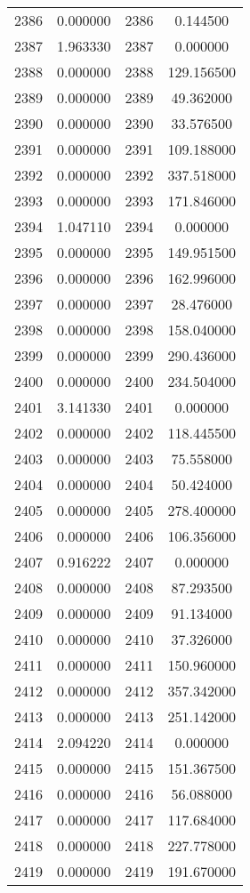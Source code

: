 \documentclass[12pt]{article}
\begin{document}
\begin{longtable}{@{}cccc@{}}
2386 & 0.000000 & 2386 & 0.144500 \\
2387 & 1.963330 & 2387 & 0.000000 \\
2388 & 0.000000 & 2388 & 129.156500 \\
2389 & 0.000000 & 2389 & 49.362000 \\
2390 & 0.000000 & 2390 & 33.576500 \\
2391 & 0.000000 & 2391 & 109.188000 \\
2392 & 0.000000 & 2392 & 337.518000 \\
2393 & 0.000000 & 2393 & 171.846000 \\
2394 & 1.047110 & 2394 & 0.000000 \\
2395 & 0.000000 & 2395 & 149.951500 \\
2396 & 0.000000 & 2396 & 162.996000 \\
2397 & 0.000000 & 2397 & 28.476000 \\
2398 & 0.000000 & 2398 & 158.040000 \\
2399 & 0.000000 & 2399 & 290.436000 \\
2400 & 0.000000 & 2400 & 234.504000 \\
2401 & 3.141330 & 2401 & 0.000000 \\
2402 & 0.000000 & 2402 & 118.445500 \\
2403 & 0.000000 & 2403 & 75.558000 \\
2404 & 0.000000 & 2404 & 50.424000 \\
2405 & 0.000000 & 2405 & 278.400000 \\
2406 & 0.000000 & 2406 & 106.356000 \\
2407 & 0.916222 & 2407 & 0.000000 \\
2408 & 0.000000 & 2408 & 87.293500 \\
2409 & 0.000000 & 2409 & 91.134000 \\
2410 & 0.000000 & 2410 & 37.326000 \\
2411 & 0.000000 & 2411 & 150.960000 \\
2412 & 0.000000 & 2412 & 357.342000 \\
2413 & 0.000000 & 2413 & 251.142000 \\
2414 & 2.094220 & 2414 & 0.000000 \\
2415 & 0.000000 & 2415 & 151.367500 \\
2416 & 0.000000 & 2416 & 56.088000 \\
2417 & 0.000000 & 2417 & 117.684000 \\
2418 & 0.000000 & 2418 & 227.778000 \\
2419 & 0.000000 & 2419 & 191.670000 \\

\end{longtable}
\end{document}
